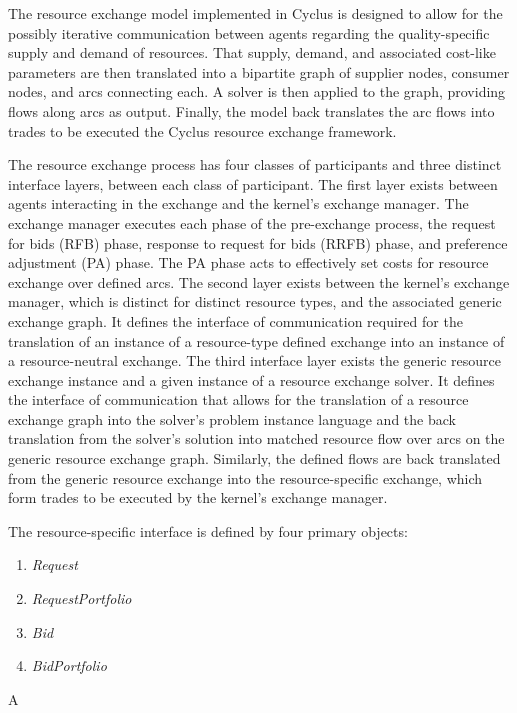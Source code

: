 The resource exchange model implemented in Cyclus is designed to allow for the
possibly iterative communication between agents regarding the quality-specific
supply and demand of resources. That supply, demand, and associated cost-like
parameters are then translated into a bipartite graph of supplier nodes,
consumer nodes, and arcs connecting each. A solver is then applied to the graph,
providing flows along arcs as output. Finally, the model back translates the arc
flows into trades to be executed the Cyclus resource exchange framework.

The resource exchange process has four classes of participants and three
distinct interface layers, between each class of participant. The first layer
exists between agents interacting in the exchange and the kernel's exchange
manager. The exchange manager executes each phase of the pre-exchange process,
the request for bids (RFB) phase, response to request for bids (RRFB) phase, and
preference adjustment (PA) phase. The PA phase acts to effectively set costs for
resource exchange over defined arcs. The second layer exists between the
kernel's exchange manager, which is distinct for distinct resource types, and
the associated generic exchange graph. It defines the interface of communication
required for the translation of an instance of a resource-type defined exchange
into an instance of a resource-neutral exchange. The third interface layer
exists the generic resource exchange instance and a given instance of a resource
exchange solver. It defines the interface of communication that allows for the
translation of a resource exchange graph into the solver's problem instance
language and the back translation from the solver's solution into matched
resource flow over arcs on the generic resource exchange graph. Similarly, the
defined flows are back translated from the generic resource exchange into the
resource-specific exchange, which form trades to be executed by the kernel's
exchange manager.


The resource-specific interface is defined by four primary objects:
\begin{enumerate}
  \item \textit{Request}
  \item \textit{RequestPortfolio}
  \item \textit{Bid}
  \item \textit{BidPortfolio}
\end{enumerate}

A 
